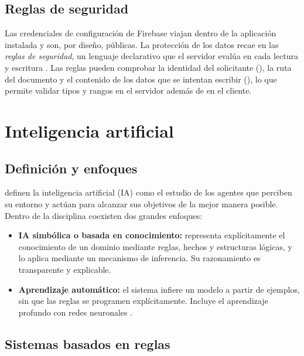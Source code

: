 \subsection{Reglas de seguridad}

Las credenciales de configuración de Firebase viajan dentro de la aplicación
instalada y son, por diseño, públicas. La protección de los datos recae en las
\emph{reglas de seguridad}, un lenguaje declarativo que el servidor evalúa en
cada lectura y escritura \citep{firestorerules}. Las reglas pueden comprobar la
identidad del solicitante (), la ruta del documento y
el contenido de los datos que se intentan escribir
(), lo que permite validar tipos y rangos en el
servidor además de en el cliente.

\section{Inteligencia artificial}
\label{sec:mt-ia}

\subsection{Definición y enfoques}

\citet{russell2020} definen la inteligencia artificial (IA) como el estudio de
los agentes que perciben su entorno y actúan para alcanzar sus objetivos de la
mejor manera posible. Dentro de la disciplina coexisten dos grandes enfoques:

\begin{itemize}
    \item \textbf{IA simbólica o basada en conocimiento:} representa
    explícitamente el conocimiento de un dominio mediante reglas, hechos y
    estructuras lógicas, y lo aplica mediante un mecanismo de inferencia. Su
    razonamiento es transparente y explicable.
    \item \textbf{Aprendizaje automático:} el sistema infiere un modelo a partir
    de ejemplos, sin que las reglas se programen explícitamente. Incluye el
    aprendizaje profundo con redes neuronales \citep{goodfellow2016}.
\end{itemize}

\subsection{Sistemas basados en reglas}

